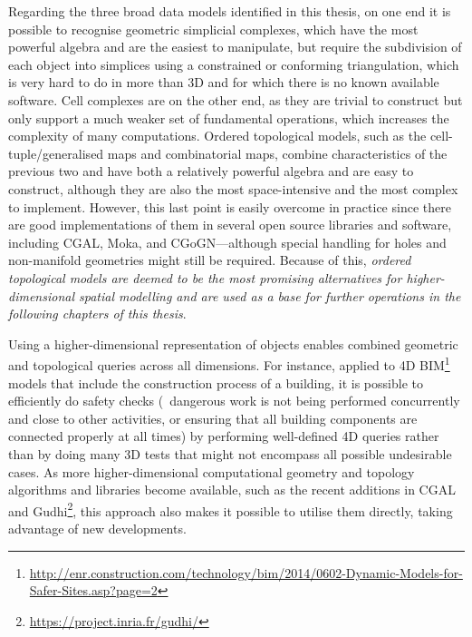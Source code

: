 Regarding the three broad data models identified in this thesis, on one end it is possible to recognise geometric simplicial complexes, which have the most powerful algebra and are the easiest to manipulate, but require the subdivision of each object into simplices using a constrained or conforming triangulation, which is very hard to do in more than 3D and for which there is no known available software.
Cell complexes are on the other end, as they are trivial to construct but only support a much weaker set of fundamental operations, which increases the complexity of many computations.
Ordered topological models, such as the cell-tuple/generalised maps and combinatorial maps, combine characteristics of the previous two and have both a relatively powerful algebra and are easy to construct, although they are also the most space-intensive and the most complex to implement.
However, this last point is easily overcome in practice since there are good implementations of them in several open source libraries and software, including CGAL, Moka, and CGoGN---although special handling for holes and non-manifold geometries might still be required.\@
Because of this, \emph{ordered topological models are deemed to be the most promising alternatives for higher-dimensional spatial modelling and are used as a base for further operations in the following chapters of this thesis}.

Using a higher-dimensional representation of objects enables combined geometric and topological queries across all dimensions.
For instance, applied to 4D BIM\footnote{\url{http://enr.construction.com/technology/bim/2014/0602-Dynamic-Models-for-Safer-Sites.asp?page=2}} models that include the construction process of a building, it is possible to efficiently do safety checks (\eg\ dangerous work is not being performed concurrently and close to other activities, or ensuring that all building components are connected properly at all times) by performing well-defined 4D queries rather than by doing many 3D tests that might not encompass all possible undesirable cases.
As more higher-dimensional computational geometry and topology algorithms and libraries become available, such as the recent additions in CGAL and Gudhi\footnote{\url{https://project.inria.fr/gudhi/}}, this approach also makes it possible to utilise them directly, taking advantage of new developments.
